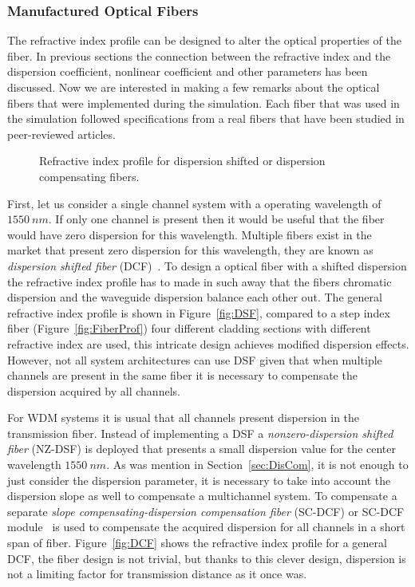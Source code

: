 \subsubsection{Manufactured Optical Fibers}\label{sec:ManOpF}

The refractive index profile can be designed to alter the optical properties of the fiber. In previous sections the connection between the refractive index and the dispersion coefficient, nonlinear coefficient and other parameters has been discussed. Now we are interested in making a few remarks about the optical fibers that were implemented during the simulation. Each fiber that was used in the simulation followed specifications from a real fibers that have been studied in peer-reviewed articles.
\begin{figure}[h]
  \centering
  \qquad
  \caption{Refractive index profile for dispersion shifted or dispersion compensating fibers. }
  \label{fig:FiberIndex}
\end{figure}

First, let us consider a single channel system with a operating wavelength of $1550~nm$. If only one channel is present then it would be useful that the fiber would have zero dispersion for this wavelength. Multiple fibers exist in the market that present zero dispersion for this wavelength, they are known as  \textit{dispersion shifted fiber} (DCF)~\cite{kato2000dispersion,kim1994measurement}. To design a optical fiber with a shifted dispersion the refractive index profile has to made in such away that the fibers chromatic dispersion and the waveguide dispersion balance each other out. The general refractive index profile is shown in Figure~\ref{fig:DSF}, compared to a step index fiber (Figure~\ref{fig:FiberProf}) four different cladding sections with different refractive index are used, this intricate design achieves modified dispersion effects. However, not all system architectures can use DSF given that when multiple channels are present in the same fiber it is necessary to compensate the dispersion acquired by all channels.


For WDM systems it is usual that all channels present dispersion in the transmission fiber. Instead of implementing a DSF a \textit{nonzero-dispersion shifted fiber} (NZ-DSF) is deployed that presents a small dispersion value for the center wavelength $1550~nm$. As was mention in Section~\ref{sec:DisCom}, it is not enough to just consider the dispersion parameter, it is necessary to take into account the dispersion slope as well to compensate a multichannel system. To compensate a separate \textit{slope compensating-dispersion compensation fiber} (SC-DCF) or SC-DCF module~\cite{aikawa2005dispersion} is used to compensate the acquired dispersion for all channels in a short span of fiber. Figure~\ref{fig:DCF} shows the refractive index profile for a general DCF, the fiber design is not trivial, but thanks to this clever design, dispersion is not a limiting factor for transmission distance as it once was.



